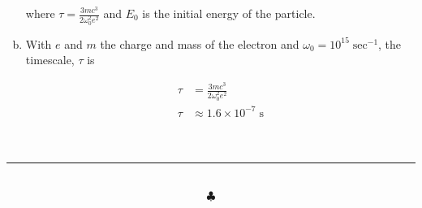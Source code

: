 \documentclass[]{article}
\begin{document}
\begin{enumerate}[a)]
where $\tau = \frac{3mc^3}{2\omega_0^2e^2}$ and $E_0$ is the initial energy of the particle. \\

\item With $e$ and $m$ the charge and mass of the electron and $\omega_0 = 10^{15} \; \text{sec}^{-1}$, the timescale, $\tau$ is

\begin{equation}
\begin{split}
\tau & =  \frac{3mc^3}{2\omega_0^2e^2} \\
\tau & \approx 1.6\times10^{-7} \; \text{s} \\
\end{split}
\end{equation}



\end{enumerate}




\hfill \\ 
\noindent\rule{15cm}{0.4pt} \\

$$\clubsuit$$
\end{document}
